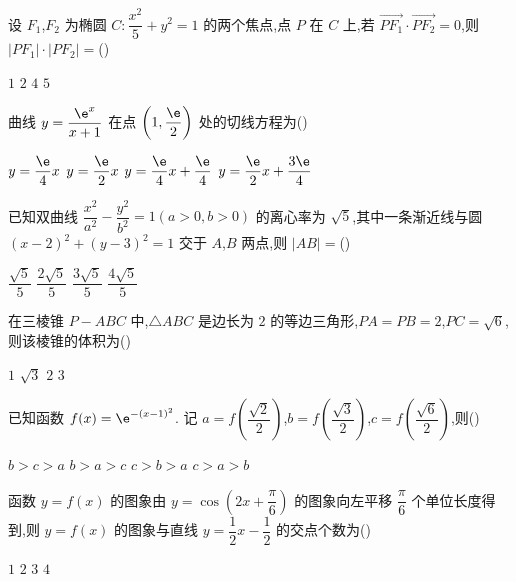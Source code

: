 \begin{problem}
设 \(F_1\),\(F_2\) 为椭圆 \(C:\dfrac{x^2}{5}+y^2=1\) 的两个焦点,点 \(P\) 在 \(C\) 上,若 \(\overrightarrow{PF_1}\cdot\overrightarrow{PF_2}=0\),则 \(\left|PF_1\right|\cdot\left|PF_2\right|=\)(\quad)

\choices
    {\(1\)}
    {\(2\)}
    {\(4\)}
    {\(5\)}
\end{problem}

\begin{problem}
曲线 \(y=\dfrac{\e^x}{x+1}\) 在点 \(\left(1,\dfrac{\e}{2}\right)\) 处的切线方程为(\quad)

\choices
    {\(y=\dfrac{\e}{4}x\)}
    {\(y=\dfrac{\e}{2}x\)}
    {\(y=\dfrac{\e}{4}x+\dfrac{\e}{4}\)}
    {\(y=\dfrac{\e}{2}x+\dfrac{3\e}{4}\)}
\end{problem}

\begin{problem}
已知双曲线 \(\dfrac{x^2}{a^2}-\dfrac{y^2}{b^2}=1\left(a>0,b>0\right)\) 的离心率为 \(\sqrt{5}\),其中一条渐近线与圆 \(\left(x-2\right)^2+\left(y-3\right)^2=1\) 交于 \(A\),\(B\) 两点,则 \(|AB|=\)(\quad)

\choices
    {\(\dfrac{\sqrt{5}}{5}\)}
    {\(\dfrac{2\sqrt{5}}{5}\)}
    {\(\dfrac{3\sqrt{5}}{5}\)}
    {\(\dfrac{4\sqrt{5}}{5}\)}
\end{problem}

\begin{problem}
在三棱锥 \(P-ABC\) 中,\(\triangle ABC\) 是边长为 \(2\) 的等边三角形,\(PA=PB=2\),\(PC=\sqrt{6}\),则该棱锥的体积为(\quad)

\choices
    {\(1\)}
    {\(\sqrt{3}\)}
    {\(2\)}
    {\(3\)}
\end{problem}

\begin{problem}
已知函数 \(f(x)=\e^{-\left(x-1\right)^2}\). 记 \(a=f\left(\dfrac{\sqrt{2}}{2}\right)\),\(b=f\left(\dfrac{\sqrt{3}}{2}\right)\),\(c=f\left(\dfrac{\sqrt{6}}{2}\right)\),则(\quad)

\choices
    {\(b>c>a\)}
    {\(b>a>c\)}
    {\(c>b>a\)}
    {\(c>a>b\)}
\end{problem}

\begin{problem}
函数 \(y=f(x)\) 的图象由 \(y=\cos\left(2x+\dfrac{\pi}{6}\right)\) 的图象向左平移 \(\dfrac{\pi}{6}\) 个单位长度得到,则 \(y=f(x)\) 的图象与直线 \(y=\dfrac{1}{2}x-\dfrac{1}{2}\) 的交点个数为(\quad)

\choices
    {\(1\)}
    {\(2\)}
    {\(3\)}
    {\(4\)}
\end{problem}


